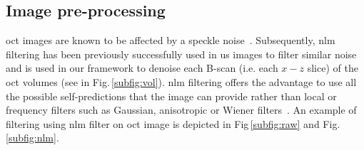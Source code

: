 


\subsection{Image pre-processing}\label{subsec:prepro}

\Ac{oct} images are known to be affected by a speckle noise~\cite{schmitt1999speckle}.
Subsequently, \ac{nlm}~\cite{buades2005non} filtering has been previously successfully used in \ac{us} images to filter similar noise~\cite{Coupe2009} and is used in our framework to denoise each B-scan (i.e. each $x-z$ slice) of the \ac{oct} volumes (see in Fig.\,\ref{subfig:vol}).
\ac{nlm} filtering offers the advantage to use all the possible self-predictions that the image can provide rather than local or frequency filters such as Gaussian, anisotropic or Wiener filters~\cite{buades2005non}.
An example of filtering using \ac{nlm} filter on \ac{oct} image is depicted in Fig\,\ref{subfig:raw} and Fig.\,\ref{subfig:nlm}.

